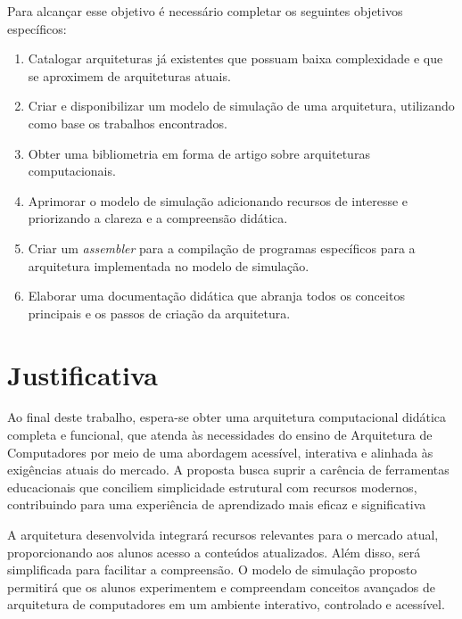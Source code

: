 \documentclass[
	12pt,				%
	openright,			%
	oneside,			%
	a4paper,			%
	english,			%
	french,				%
	spanish,			%
	brazil,				%
	]{abntex2}
\begin{document}
Para alcançar esse objetivo é necessário completar os seguintes objetivos específicos:
\begin{enumerate}[label=\textbf{O\arabic*}]
    \item Catalogar arquiteturas já existentes que possuam baixa complexidade e que se aproximem de arquiteturas atuais. \label{ob:Catalogar}
    \item Criar e disponibilizar um modelo de simulação de uma arquitetura, utilizando como base os trabalhos encontrados. \label{ob:Modelo_Base}
    \item Obter uma bibliometria em forma de artigo sobre arquiteturas computacionais.\label{ob:bibliometria}
    \item Aprimorar o modelo de simulação adicionando recursos de interesse e priorizando a clareza e a compreensão didática. \label{ob:Modelo_Aprimorado}
    \item Criar um \textit{assembler} para a compilação de programas específicos para a arquitetura implementada no modelo de simulação.\label{ob:Assembler}
    \item Elaborar uma documentação didática que abranja todos os conceitos principais e os passos de criação da arquitetura.\label{ob:Documentação}
\end{enumerate}

\section{Justificativa}
Ao final deste trabalho, espera-se obter uma arquitetura computacional didática completa e funcional, que atenda às necessidades do ensino de Arquitetura de Computadores por meio de uma abordagem acessível, interativa e alinhada às exigências atuais do mercado. A proposta busca suprir a carência de ferramentas educacionais que conciliem simplicidade estrutural com recursos modernos, contribuindo para uma experiência de aprendizado mais eficaz e significativa

A arquitetura desenvolvida integrará recursos relevantes para o mercado atual, proporcionando aos alunos acesso a conteúdos atualizados. Além disso, será simplificada para facilitar a compreensão. O modelo de simulação proposto permitirá que os alunos experimentem e compreendam conceitos avançados de arquitetura de computadores em um ambiente interativo, controlado e acessível.
\end{document}
